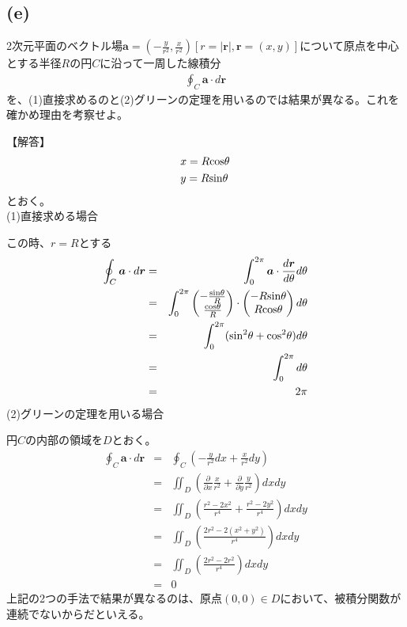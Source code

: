 \documentclass[pdflatex,ja=standard,fleqn]{bxjsarticle}
\begin{document}
\subsection*{(e)}
\begin{screen}
    2次元平面のベクトル場$\boldsymbol{a}=(-\frac{y}{r^2},\frac{x}{r^2})\left[r=|\boldsymbol{r}|,\boldsymbol{r}=(x,y)\right]$について原点を中心とする半径$R$の円$C$に沿って一周した線積分
    \begin{eqnarray*}
        \oint_C \boldsymbol{a}\cdot d\boldsymbol{r}
    \end{eqnarray*}
    を、(1)直接求めるのと(2)グリーンの定理を用いるのでは結果が異なる。これを確かめ理由を考察せよ。
\end{screen}
【解答】
\begin{align*}
    &x=R{\rm cos}\theta\\
    &y=R{\rm sin}\theta
\end{align*}
とおく。\\
(1)直接求める場合\par
この時、$r=R$とする
\begin{eqnarray*}
    \oint_C \boldsymbol{a}\cdot d\boldsymbol{r}&=&\int_{0}^{2\pi} \boldsymbol{a}\cdot\frac{d\boldsymbol{r}}{d\theta}d\theta\\
    &=&\int_{0}^{2\pi} \begin{pmatrix}-\frac{{\rm sin}\theta}{R}\\\frac{{\rm cos}\theta}{R}\end{pmatrix}\cdot\begin{pmatrix}-R{\rm sin}\theta\\R{\rm cos}\theta\end{pmatrix}d\theta\\
    &=&\int_{0}^{2\pi} ({\rm sin^2}\theta+{\rm cos^2}\theta)d\theta\\
    &=&\int_{0}^{2\pi} d\theta\\
    &=&2\pi
\end{eqnarray*}
(2)グリーンの定理を用いる場合\par
円$C$の内部の領域を$D$とおく。
\begin{eqnarray*}
    \oint_C \boldsymbol{a}\cdot d\boldsymbol{r}&=&\oint_C \left(-\frac{y}{r^2}dx+\frac{x}{r^2}dy\right)\\
    &=&\iint_D \left(\frac{\partial}{\partial x}\frac{x}{r^2}+\frac{\partial}{\partial y}\frac{y}{r^2}\right)dxdy\\
    &=&\iint_D \left(\frac{r^2-2x^2}{r^4}+\frac{r^2-2y^2}{r^4}\right)dxdy\\
    &=&\iint_D \left(\frac{2r^2-2(x^2+y^2)}{r^4}\right)dxdy\\
    &=&\iint_D \left(\frac{2r^2-2r^2}{r^4}\right)dxdy\\
    &=&0
\end{eqnarray*}
上記の2つの手法で結果が異なるのは、原点$(0,0)\in D$において、被積分関数が連続でないからだといえる。
\end{document}
